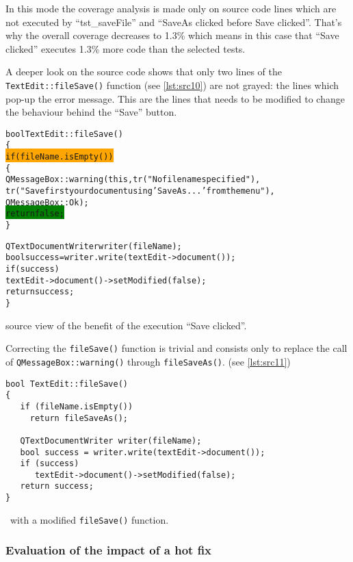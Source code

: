 In this mode the coverage analysis is made only on source code lines which are
not executed by ``\textsf{tst\_saveFile}'' and ``\textsf{SaveAs clicked before Save clicked}''.
That's why the overall coverage decreases to 1.3\% which means in this case
that ``\textsf{Save clicked}'' executes 1.3\% more code than the selected tests. 

A deeper look on the source code shows that  only two lines of the
\verb$TextEdit::fileSave()$ function (see \autoref{lst:src10}) are not grayed:
the lines which pop-up the error message. This are the lines that needs to be
modified to change the behaviour behind the ``\textsf{Save}'' button.

\begin{listings}[H]
  \scriptsize
\begin{alltt}
bool TextEdit::fileSave()
\{
\colorbox{orange}{  if (fileName.isEmpty())}
  \{
    QMessageBox::warning(this,tr("No file name specified"),
      tr("Save first your document using 'Save As...' from the menu"),
      QMessageBox::Ok );
\colorbox{green}{    return false;}
   \}

  QTextDocumentWriter writer(fileName);
  bool success = writer.write(textEdit->document());
\colorbox{Graylight}{  if (success)}
\colorbox{Graylight}{     textEdit->document()->setModified(false);}
\colorbox{Graylight}{  return success;}
\}
\end{alltt}
\caption{{\CoverageBrowser} source view of the benefit of the execution ``Save clicked''.}
\label{lst:src10}
\end{listings}

Correcting the \verb$fileSave()$ function is trivial and consists only to
replace the call of \verb$QMessageBox::warning()$ through \verb$fileSaveAs()$.
(see \autoref{lst:src11})

\begin{listings}[H]
  \scriptsize
\begin{verbatim}
bool TextEdit::fileSave()
{
   if (fileName.isEmpty())
     return fileSaveAs();

   QTextDocumentWriter writer(fileName);
   bool success = writer.write(textEdit->document());
   if (success)
      textEdit->document()->setModified(false);
   return success;
}
\end{verbatim}
\caption{\TextEdit\ with a modified \texttt{fileSave()} function.}
\label{lst:src11}
\end{listings}

\subsubsection{\label{sec:patchimpact}Evaluation of the impact of a hot fix}

